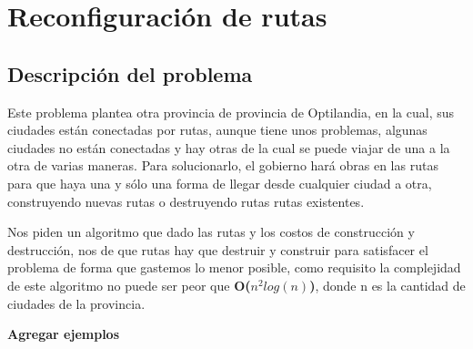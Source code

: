 \section{Reconfiguración de rutas}

\subsection{Descripción del problema}
Este problema plantea otra provincia de provincia de Optilandia, en la cual, sus ciudades están conectadas por rutas, aunque tiene unos problemas, algunas ciudades no están conectadas y hay otras de la cual se puede viajar de una a la otra de varias maneras. 
Para solucionarlo, el gobierno hará obras en las rutas para que haya una y sólo una forma de llegar desde cualquier ciudad a otra, construyendo nuevas rutas o destruyendo rutas rutas existentes.
\\
\par
Nos piden un algoritmo que dado las rutas y los costos de construcción y destrucción, nos de que rutas hay que destruir y construir para satisfacer el problema de forma que gastemos lo menor posible, como requisito la complejidad de este algoritmo no puede ser peor que \textbf{O($n^2log(n)$)}, donde n es la cantidad de ciudades de la provincia.
\\
\par
\textbf{Agregar ejemplos}
\\
\par
